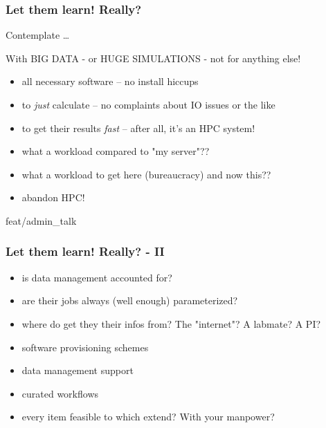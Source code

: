 \begin{frame}
  \frametitle{Let them learn! Really?}
  \bcinfo Contemplate \ldots
  \pause
  \begin{question}
  	\pause With BIG DATA - or HUGE SIMULATIONS - not for anything else!
  \end{question}
  \pause
  \begin{question}
  	\begin{itemize}[<+->]
  		\item all necessary software -- no install hiccups
  		\item to \emph{just} calculate -- no complaints about IO issues or the like
  		\item to get their results \emph{fast} -- after all, it's an HPC system!
  	\end{itemize}
  \end{question}
  \pause
  \begin{question}
  	\begin{itemize}[<+->]
  		\item what a workload compared to "my server"??
  		\item what a workload to get here (bureaucracy) and now this??
  		\item abandon HPC!
  	\end{itemize}
  \end{question}	
\end{frame}	feat/admin_talk

\begin{frame}
  \frametitle{Let them learn! Really? - II}
  \begin{question}
	\begin{itemize}[<+->]
		\item is data management accounted for?
		\item are their jobs always (well enough) parameterized?
		\item where do get they their infos from? The "internet"? A labmate? A PI?
	\end{itemize}	
  \end{question}
  \pause
  \begin{question}
    \begin{itemize}[<+->]
      \item software provisioning schemes
      \item data management support
      \item curated workflows
      \item every item feasible to which extend? With your manpower?
    \end{itemize}
  \end{question}
\end{frame}	


